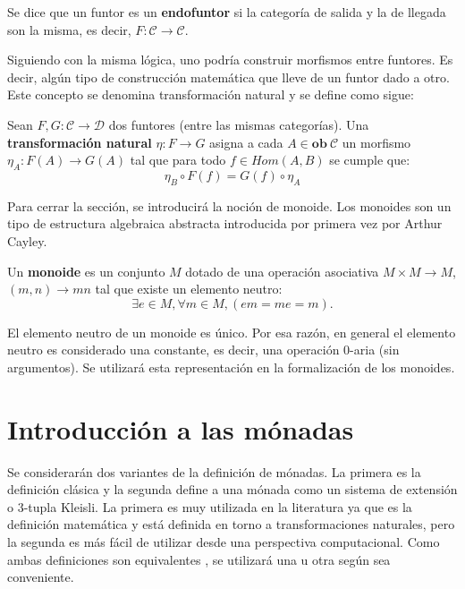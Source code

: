 Se dice que un funtor es un \textbf{endofuntor} si la categoría de salida y la de llegada son la misma, es decir, $\mathit{F} : \mathscr{C} \rightarrow \mathscr{C}$.

Siguiendo con la misma lógica, uno podría construir morfismos entre funtores. Es decir, algún tipo de construcción matemática que lleve de un funtor dado a otro. Este concepto se denomina transformación natural y se define como sigue:

\begin{definition}
Sean $\mathit{F}, \mathit{G} : \mathscr{C} \rightarrow \mathscr{D}$ dos funtores (entre las mismas categorías). Una \textbf{transformación natural} $\eta : \mathit{F} \rightarrow \mathit{G}$ asigna a cada $A \in \mathbf{ob} \ \mathscr{C}$ un morfismo $\eta_A : \mathit{F}(A) \rightarrow \mathit{G}(A)$ tal que para todo $f \in Hom(A,B)$ se cumple que: 
\begin{equation*}
	\eta_B \circ \mathit{F}(f) = \mathit{G}(f) \circ \eta_A 
\end{equation*}
\end{definition}

Para cerrar la sección, se introducirá la noción de monoide. Los monoides son un tipo de estructura algebraica abstracta introducida por primera vez por Arthur Cayley.

\begin{definition}[Monoide]\label{def:monoid}
Un \textbf{monoide} es un conjunto $M$ dotado de una operación asociativa $M \times M \rightarrow M$, $(m,n) \rightarrow mn$ tal que existe un elemento neutro:
\begin{equation*}
\exists e \in M, \forall m \in M, (em = me = m).
\end{equation*}
\end{definition}

El elemento neutro de un monoide es único. Por esa razón, en general el elemento neutro es considerado una constante, es decir, una operación 0-aria (sin argumentos). Se utilizará esta representación en la formalización de los monoides.

\section{Introducción a las mónadas}\label{monconc:monadas}

Se considerarán dos variantes de la definición de mónadas. La primera es la definición clásica y la segunda define a una mónada como un sistema de extensión o 3-tupla Kleisli. La primera es muy utilizada en la literatura ya que es la definición matemática y está definida en torno a transformaciones naturales, pero la segunda es más fácil de utilizar desde una perspectiva computacional. Como ambas definiciones son equivalentes \cite{manes:1976}, se utilizará una u otra según sea conveniente.

